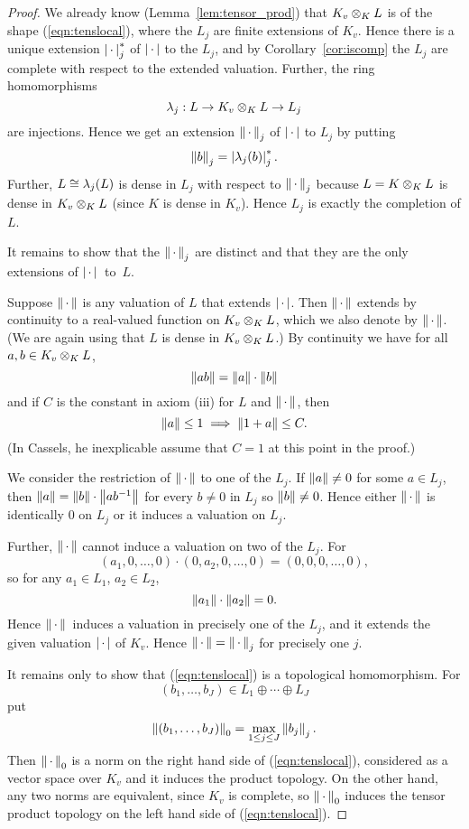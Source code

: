 \begin{proof}
  We already know (Lemma~\ref{lem:tensor_prod}) that $K_v\otimes_K L$
  is of the shape (\ref{eqn:tenslocal}), where the $L_j$ are finite
  extensions of $K_v$.  Hence there is a unique extension
  $\left|\,\cdot\,\right|_j^*$ of $\left|\,\cdot\,\right|$ to the $L_j$, and by
  Corollary~\ref{cor:iscomp} the $L_j$ are complete with respect to
  the extended valuation.  Further,  the
  ring homomorphisms
  $$
  \lambda_j : L \to K_v\otimes_K L \to L_j
  $$
  are injections.   Hence we get an extension $\left\|\,\cdot\,\right\|_j$ of $\left|\,\cdot\,\right|$ to $L_j$ by putting 
$$
\left\|b\right\|_j = \left|\lambda_j(b)\right|_j^*.
$$
Further, $L\cong \lambda_j(L)$ is dense in $L_j$ with respect to $\left\|\,\cdot\,\right\|_j$ because
$L = K\otimes_K L$ is dense in $K_v\otimes_K L$ (since $K$ is dense
in $K_v$).  Hence $L_j$ is exactly the completion of $L$.

It remains to show that the $\left\|\,\cdot\,\right\|_j$ are distinct and that they
are the only extensions of $\left|\,\cdot\,\right|{}$ to~$L$.

Suppose $\left\|\,\cdot\,\right\|$ is any valuation of $L$ that extends $\left|\,\cdot\,\right|$.  Then
$\left\|\,\cdot\,\right\|$ extends by continuity to a real-valued function on $K_v\otimes_K L$,
which we also denote by $\left\|\,\cdot\,\right\|$. (We are again using that $L$ is dense
in $K_v\otimes_K L$.)  By continuity we have for all $a,b\in K_v\otimes_K L$,
$$
  \left\|ab\right\| = \left\|a\right\|\cdot \left\|b\right\|
$$
and if $C$ is the constant in axiom (iii) for $L$ and $\left\|\,\cdot\,\right\|$, then
$$
 \left\|a\right\|\leq 1 \implies \left\|1+a\right\|\leq C.
$$
(In Cassels, he inexplicable assume that $C=1$ at this point in the proof.)

We consider the restriction of $\left\|\,\cdot\,\right\|$ to one of the $L_j$.  If $\left\|a\right\|\neq 0$
for some $a\in L_j$, then $\left\|a\right\| = \left\|b\right\|\cdot \left\|ab^{-1}\right\|$ for every
$b\neq 0$ in $L_j$ so $\left\|b\right\| \neq 0$.  Hence either $\left\|\,\cdot\,\right\|$ is identically
$0$ on $L_j$ or it induces a valuation on $L_j$.

Further, $\left\|\,\cdot\,\right\|$ cannot induce a valuation on two of the $L_j$.  For
$$
  (a_1,0,\ldots, 0)\cdot (0,a_2,0,\ldots,0) = (0,0,0,\ldots,0),
$$
so for any $a_1\in L_1$, $a_2\in L_2$,
$$
  \left\|a_1\right\|\cdot \left\|a_2\right\| = 0.
$$
Hence $\left\|\,\cdot\,\right\|{}$ induces a valuation in precisely one of the $L_j$,
and it extends the given valuation $\left|\,\cdot\,\right|$ of $K_v$.  Hence $\left\|\,\cdot\,\right\| = \left\|\,\cdot\,\right\|_j$
for precisely one $j$.

It remains only to show that (\ref{eqn:tenslocal}) is a topological homomorphism.
For $$(b_1,\ldots, b_J)\in L_1\oplus \cdots \oplus L_J$$ put
$$
\left\|(b_1,\ldots, b_J)\right\|_0 = \max_{1\leq j \leq J} \left\|b_j\right\|_j.
$$
Then $\left\|\,\cdot\,\right\|_0$ is a norm on the right hand side of (\ref{eqn:tenslocal}),
considered as a vector space over $K_v$ and it induces the product topology.
On the other hand, any two norms are equivalent, since $K_v$ is complete,
so $\left\|\,\cdot\,\right\|_0$ induces the tensor product topology on the left hand side of
(\ref{eqn:tenslocal}).
\end{proof}

